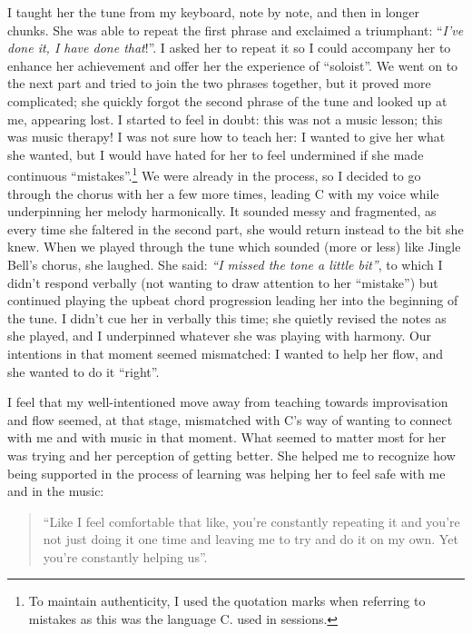 \documentclass[authordate, empirical]{jote-new-article}
\begin{document}
I taught her the tune from my keyboard, note by note, and then in longer chunks. She was able to repeat the first phrase and exclaimed a triumphant: “\emph{I've done it, I have done that}!”. I asked her to repeat it so I could accompany her to enhance her achievement and offer her the experience of “soloist”. We went on to the next part and tried to join the two phrases together, but it proved more complicated; she quickly forgot the second phrase of the tune and looked up at me, appearing lost. I started to feel in doubt: this was not a music lesson; this was music therapy! I was not sure how to teach her: I wanted to give her what she wanted, but I would have hated for her to feel undermined if she made continuous “mistakes”.\footnote{ To maintain authenticity, I used the quotation marks when referring to mistakes as this was the language C. used in sessions.} We were already in the process, so I decided to go through the chorus with her a few more times, leading C with my voice while underpinning her melody harmonically. It sounded messy and fragmented, as every time she faltered in the second part, she would return instead to the bit she knew. When we played through the tune which sounded (more or less) like Jingle Bell's chorus, she laughed. She said: \emph{“I missed the tone a little bit”}, to which I didn't respond verbally (not wanting to draw attention to her “mistake”) but continued playing the upbeat chord progression leading her into the beginning of the tune. I didn't cue her in verbally this time; she quietly revised the notes as she played, and I underpinned whatever she was playing with harmony. Our intentions in that moment seemed mismatched: I wanted to help her flow, and she wanted to do it “right”.







I feel that my well-intentioned move away from teaching towards improvisation and flow seemed, at that stage, mismatched with C's way of wanting to connect with me and with music in that moment. What seemed to matter most for her was trying\emph{ }and her perception of getting better. She helped me to recognize how being supported in the process of learning was helping her to feel safe with me and in the music:







\begin{quote}
  “Like I feel comfortable that like, you're constantly repeating it and you're not just doing it one time and leaving me to try and do it on my own. Yet you're constantly helping us”.
\end{quote}
\end{document}
